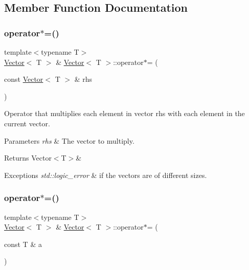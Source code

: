 \subsection{Member Function Documentation}
\mbox{\label{classVector_a3b3e94a4ee6601a8c3ceaed790c2d965}} 
\subsubsection{\texorpdfstring{operator$\ast$=()}{operator*=()}\hspace{0.1cm}{\footnotesize\ttfamily [1/2]}}
{\footnotesize\ttfamily template$<$typename T$>$ \\
\mbox{\hyperlink{classVector}{Vector}}$<$ T $>$ \& \mbox{\hyperlink{classVector}{Vector}}$<$ T $>$\+::operator$\ast$= (\begin{DoxyParamCaption}\item[{const \mbox{\hyperlink{classVector}{Vector}}$<$ T $>$ \&}]{rhs }\end{DoxyParamCaption})\hspace{0.3cm}{\ttfamily [inline]}}



Operator that multiplies each element in vector {\ttfamily rhs} with each element in the current vector. 


\begin{DoxyParams}{Parameters}
{\em rhs} & The vector to multiply. \\
\hline
\end{DoxyParams}
\begin{DoxyReturn}{Returns}
Vector$<$\+T$>$\&
\end{DoxyReturn}

\begin{DoxyExceptions}{Exceptions}
{\em std\+::logic\+\_\+error} & if the vectors are of different sizes. \\
\hline
\end{DoxyExceptions}
\mbox{\label{classVector_a02e9c5296c7ddb1a2047a8c80d93e0d5}} 
\subsubsection{\texorpdfstring{operator$\ast$=()}{operator*=()}\hspace{0.1cm}{\footnotesize\ttfamily [2/2]}}
{\footnotesize\ttfamily template$<$typename T$>$ \\
\mbox{\hyperlink{classVector}{Vector}}$<$ T $>$ \& \mbox{\hyperlink{classVector}{Vector}}$<$ T $>$\+::operator$\ast$= (\begin{DoxyParamCaption}\item[{const T \&}]{a }\end{DoxyParamCaption})\hspace{0.3cm}{\ttfamily [inline]}}



